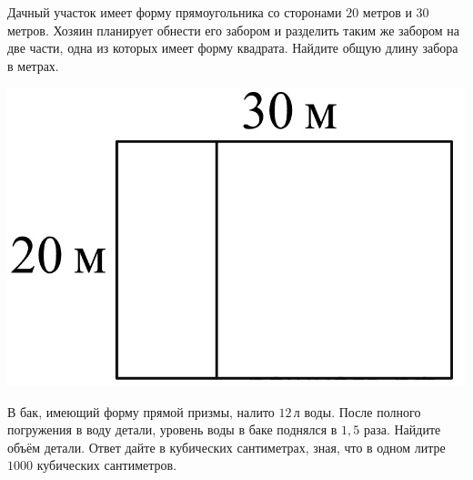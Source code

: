 \begin{training}[1]
\begin{listofex}
\begin{minipage}[t]{0.27\linewidth}
	\end{minipage}
	\item
	\begin{minipage}[t]{0.68\linewidth}
		Дачный участок имеет форму прямоугольника со сторонами \(20\) метров и \(30\) метров. Хозяин планирует обнести его забором и разделить таким же забором на две части, одна из которых имеет форму квадрата. Найдите общую длину забора в метрах.
	\end{minipage}
	\hspace{0.02\linewidth}
	\begin{minipage}[t]{0.27\linewidth}
		\includegraphics[align=t, width=\linewidth]{../pics/G101M8H3-10}
	\end{minipage}
	\item
	\begin{minipage}[t]{0.68\linewidth}
		В бак, имеющий форму прямой призмы, налито \(12\) л воды. После полного погружения в воду детали, уровень воды в баке поднялся в \(1,5\) раза. Найдите объём детали. Ответ дайте в кубических сантиметрах, зная, что в одном литре \(1000\) кубических сантиметров.
	\end{minipage}
	\hspace{0.02\linewidth}
	\begin{minipage}[t]{0.27\linewidth}

\end{minipage}
\end{listofex}
\end{training}

